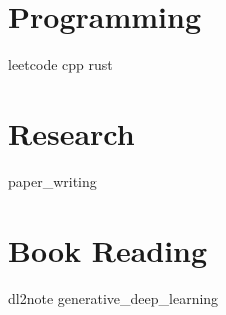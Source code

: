 \documentclass{scinote}
\begin{document}
\part{Programming}

{leetcode}
{cpp}
{rust}

\part{Research}
{paper_writing}

\part{Book Reading}
{dl2note}
{generative_deep_learning}

\begin{appendices}
	
\end{appendices}

\backmatter


\printbibliography[heading=bibintoc]
\printindex
\end{document}

